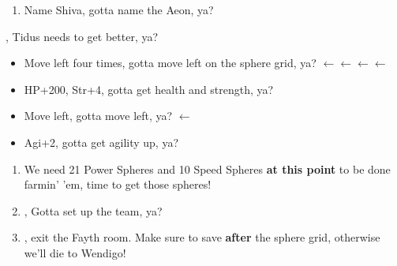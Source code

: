 \begin{enumerate}[resume]
    \item Name Shiva, gotta name the Aeon, ya?
\end{enumerate}
\begin{spheregrid}
    \begin{itemize}
        \tidusf, Tidus needs to get better, ya?
        \begin{itemize}
            \item Move left four times, gotta move left on the sphere grid, ya? $\leftarrow\leftarrow\leftarrow\leftarrow$
            \item HP+200, Str+4, gotta get health and strength, ya?
            \item Move left, gotta move left, ya? $\leftarrow$
            \item Agi+2, gotta get agility up, ya?
        \end{itemize}
    \end{itemize}
\end{spheregrid}
\begin{enumerate}[resume]
    \item We need 21 Power Spheres and 10 Speed Spheres \textbf{at this point} to be done farmin' 'em, time to get those spheres!
    \item \formation{\rikku}{\tidus}{\kimahri}, Gotta set up the team, ya?
    \item \save, exit the Fayth room. Make sure to save \textbf{after} the sphere grid, otherwise we'll die to Wendigo!
\end{enumerate}
